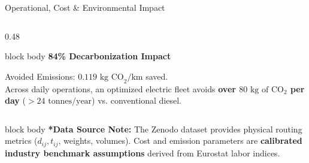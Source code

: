 \documentclass[aspectratio=169,10pt]{beamer}
\begin{document}
\begin{frame}{Operational, Cost \& Environmental Impact}
\begin{columns}[T,totalwidth=\textwidth]
\begin{column}{0.48\textwidth}
        \vspace{0.06cm}
        \begin{beamercolorbox}[rounded=true,shadow=false,wd=\linewidth,sep=3.5pt]{block body}
            {\bfseries\color{Primary}\scriptsize 84\% Decarbonization Impact}\par\vspace{0.02cm}
            \scriptsize
            Avoided Emissions: $0.119\text{ kg CO}_2/\text{km}$ saved.\\
            Across daily operations, an optimized electric fleet avoids \textbf{over $80\text{ kg of }\text{CO}_2$ per day} ($>24\text{ tonnes/year}$) vs. conventional diesel.
        \end{beamercolorbox}
    \end{column}

\end{columns}

\vspace{0.08cm}
\begin{beamercolorbox}[rounded=true,shadow=false,wd=\linewidth,sep=3pt]{block body}
    \tiny\textcolor{Muted}{\textbf{*Data Source Note:} The Zenodo dataset provides physical routing metrics ($d_{ij}, t_{ij}$, weights, volumes). Cost and emission parameters are \textbf{calibrated industry benchmark assumptions} derived from Eurostat labor indices.}
\end{beamercolorbox}

\vfill
\end{frame}

\end{document}
